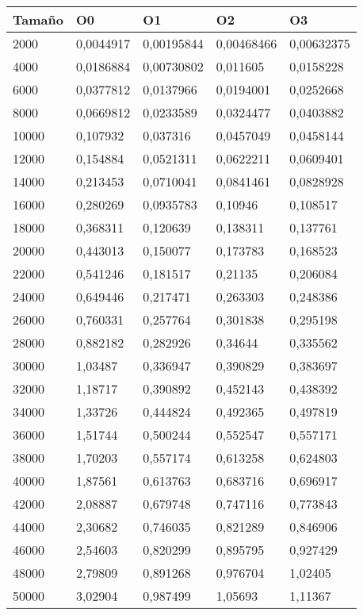 \begin{tabular}{|l|l|l|l|l|}
	\hline
	Tamaño & O0 & O1 & O2 & O3 \\
	\hline
	\hline
	2000 & 0,0044917 & 0,00195844 & 0,00468466 & 0,00632375 \\
	\hline
	4000 & 0,0186884 & 0,00730802 & 0,011605 & 0,0158228 \\
	\hline
	6000 & 0,0377812 & 0,0137966 & 0,0194001 & 0,0252668 \\
	\hline
	8000 & 0,0669812 & 0,0233589 & 0,0324477 & 0,0403882 \\
	\hline
	10000 & 0,107932 & 0,037316 & 0,0457049 & 0,0458144 \\
	\hline
	12000 & 0,154884 & 0,0521311 & 0,0622211 & 0,0609401 \\
	\hline
	14000 & 0,213453 & 0,0710041 & 0,0841461 & 0,0828928 \\
	\hline
	16000 & 0,280269 & 0,0935783 & 0,10946 & 0,108517 \\
	\hline
	18000 & 0,368311 & 0,120639 & 0,138311 & 0,137761 \\
	\hline
	20000 & 0,443013 & 0,150077 & 0,173783 & 0,168523 \\
	\hline
	22000 & 0,541246 & 0,181517 & 0,21135 & 0,206084 \\
	\hline
	24000 & 0,649446 & 0,217471 & 0,263303 & 0,248386 \\
	\hline
	26000 & 0,760331 & 0,257764 & 0,301838 & 0,295198 \\
	\hline
	28000 & 0,882182 & 0,282926 & 0,34644 & 0,335562 \\
	\hline
	30000 & 1,03487 & 0,336947 & 0,390829 & 0,383697 \\
	\hline
	32000 & 1,18717 & 0,390892 & 0,452143 & 0,438392 \\
	\hline
	34000 & 1,33726 & 0,444824 & 0,492365 & 0,497819 \\
	\hline
	36000 & 1,51744 & 0,500244 & 0,552547 & 0,557171 \\
	\hline
	38000 & 1,70203 & 0,557174 & 0,613258 & 0,624803 \\
	\hline
	40000 & 1,87561 & 0,613763 & 0,683716 & 0,696917 \\
	\hline
	42000 & 2,08887 & 0,679748 & 0,747116 & 0,773843 \\
	\hline
	44000 & 2,30682 & 0,746035 & 0,821289 & 0,846906 \\
	\hline
	46000 & 2,54603 & 0,820299 & 0,895795 & 0,927429 \\
	\hline
	48000 & 2,79809 & 0,891268 & 0,976704 & 1,02405 \\
	\hline
	50000 & 3,02904 & 0,987499 & 1,05693 & 1,11367 \\
	\hline
\end{tabular}
